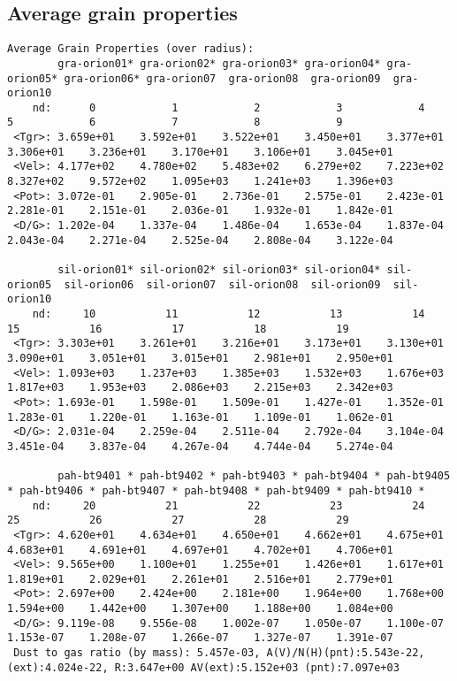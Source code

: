 {\setverbatimfontsize{\tiny}

\subsection{Average grain properties}
\begin{verbatim}
Average Grain Properties (over radius):
        gra-orion01* gra-orion02* gra-orion03* gra-orion04* gra-orion05* gra-orion06* gra-orion07  gra-orion08  gra-orion09  gra-orion10
    nd:      0            1            2            3            4            5            6            7            8            9
 <Tgr>: 3.659e+01    3.592e+01    3.522e+01    3.450e+01    3.377e+01    3.306e+01    3.236e+01    3.170e+01    3.106e+01    3.045e+01
 <Vel>: 4.177e+02    4.780e+02    5.483e+02    6.279e+02    7.223e+02    8.327e+02    9.572e+02    1.095e+03    1.241e+03    1.396e+03
 <Pot>: 3.072e-01    2.905e-01    2.736e-01    2.575e-01    2.423e-01    2.281e-01    2.151e-01    2.036e-01    1.932e-01    1.842e-01
 <D/G>: 1.202e-04    1.337e-04    1.486e-04    1.653e-04    1.837e-04    2.043e-04    2.271e-04    2.525e-04    2.808e-04    3.122e-04

        sil-orion01* sil-orion02* sil-orion03* sil-orion04* sil-orion05  sil-orion06  sil-orion07  sil-orion08  sil-orion09  sil-orion10
    nd:     10           11           12           13           14           15           16           17           18           19
 <Tgr>: 3.303e+01    3.261e+01    3.216e+01    3.173e+01    3.130e+01    3.090e+01    3.051e+01    3.015e+01    2.981e+01    2.950e+01
 <Vel>: 1.093e+03    1.237e+03    1.385e+03    1.532e+03    1.676e+03    1.817e+03    1.953e+03    2.086e+03    2.215e+03    2.342e+03
 <Pot>: 1.693e-01    1.598e-01    1.509e-01    1.427e-01    1.352e-01    1.283e-01    1.220e-01    1.163e-01    1.109e-01    1.062e-01
 <D/G>: 2.031e-04    2.259e-04    2.511e-04    2.792e-04    3.104e-04    3.451e-04    3.837e-04    4.267e-04    4.744e-04    5.274e-04

        pah-bt9401 * pah-bt9402 * pah-bt9403 * pah-bt9404 * pah-bt9405 * pah-bt9406 * pah-bt9407 * pah-bt9408 * pah-bt9409 * pah-bt9410 *
    nd:     20           21           22           23           24           25           26           27           28           29
 <Tgr>: 4.620e+01    4.634e+01    4.650e+01    4.662e+01    4.675e+01    4.683e+01    4.691e+01    4.697e+01    4.702e+01    4.706e+01
 <Vel>: 9.565e+00    1.100e+01    1.255e+01    1.426e+01    1.617e+01    1.819e+01    2.029e+01    2.261e+01    2.516e+01    2.779e+01
 <Pot>: 2.697e+00    2.424e+00    2.181e+00    1.964e+00    1.768e+00    1.594e+00    1.442e+00    1.307e+00    1.188e+00    1.084e+00
 <D/G>: 9.119e-08    9.556e-08    1.002e-07    1.050e-07    1.100e-07    1.153e-07    1.208e-07    1.266e-07    1.327e-07    1.391e-07
 Dust to gas ratio (by mass): 5.457e-03, A(V)/N(H)(pnt):5.543e-22, (ext):4.024e-22, R:3.647e+00 AV(ext):5.152e+03 (pnt):7.097e+03
\end{verbatim}
}

